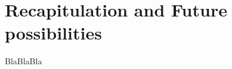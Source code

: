 
\chapter{Recapitulation and Future possibilities}
  \label{Recapitulation and Future possibilities }

BlaBlaBla
